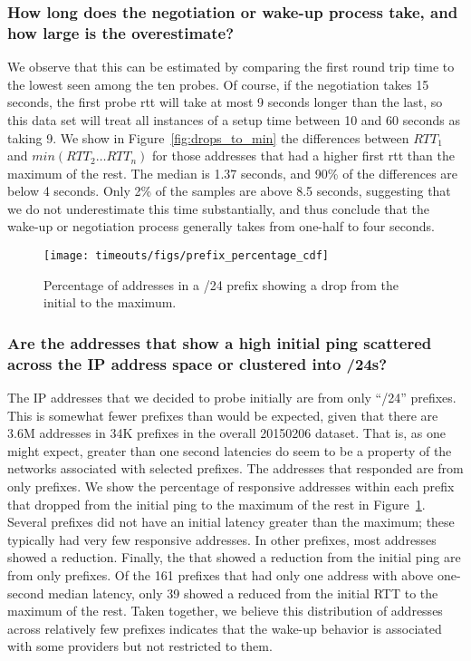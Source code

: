 \subsubsection*{How long does the negotiation or wake-up process take, and how 
large is the overestimate?}  We observe that this can be
estimated by comparing the first round trip time to the lowest 
seen among the ten probes.  Of course, if the negotiation takes
15 seconds, the first probe rtt will take at most 9 seconds 
longer than the last, so this data set will treat all instances of
a setup time between 10 and 60 seconds as taking 9. We show in Figure~\ref{fig:drops_to_min}
the differences between $RTT_1$ and $min(RTT_2 \ldots RTT_n)$
for those \countDropsToMedianAndToMax{} addresses that had a higher 
first rtt than the maximum of the rest.  The median is 1.37 seconds, and 90\% of the
differences are below 4 seconds.  Only 2\% of the samples are above 8.5 seconds,
suggesting that we do not underestimate this time substantially, and thus conclude
that the wake-up or negotiation process generally takes from one-half to four seconds.

\begin{figure}[tb]
\begin{center}
\texttt{[image: timeouts/figs/prefix\_percentage\_cdf]}
\end{center}
\caption{\label{fig:prefix_percentage_cdf}Percentage of addresses in a /24 prefix showing 
  a drop from the initial to the maximum.}
\end{figure}
\subsubsection*{Are the addresses that show a high initial
ping scattered across the IP address space or clustered into
/24s?}  The \countInitialList{} IP addresses that we decided
to probe initially are from only
\countInitialSlashTwentyFours{} ``/24'' prefixes.  This is
somewhat fewer prefixes than would be expected, given that
there are 3.6M addresses in 34K prefixes in the overall
20150206 dataset.  That is, as one might expect, greater than
one second latencies do seem to be a property of the
networks associated with selected prefixes.  The
\countResponsives{} addresses that responded are from only
\countResponsiveSlashTwentyFours{} prefixes.  We show the percentage
of responsive addresses within each prefix that dropped from the 
initial ping to the maximum of the rest in Figure~\ref{fig:prefix_percentage_cdf}.  Several
prefixes did not have an initial latency greater than the maximum; these typically had very few responsive addresses.  In other
prefixes, most addresses showed a reduction.
Finally, the
\countDropsToMedianAndToMax{} that showed a reduction from the
initial ping are from only \countDroppingSlashTwentyFours{}
prefixes.  Of the 161 prefixes that had only one address with 
above one-second median latency, only 39 showed a reduced from the
initial RTT to the maximum of the rest.  Taken together, we believe
this distribution of addresses across relatively few prefixes indicates
that the wake-up behavior is associated with some providers but not
restricted to them.

